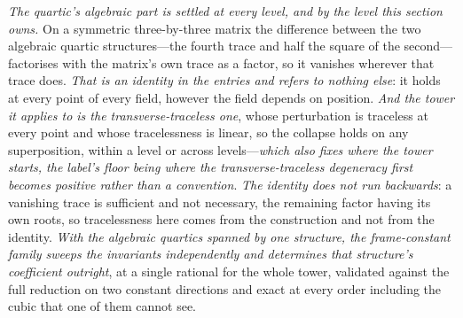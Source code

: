 \documentclass[11pt,a4paper]{article}
\theoremstyle{plain}
\theoremstyle{definition}
\theoremstyle{remark}
\begin{document}
\emph{The quartic's algebraic part is settled at every level, and by the level this section owns.} On a
symmetric three-by-three matrix the difference between the two algebraic quartic structures---the fourth
trace and half the square of the second---factorises with the matrix's own trace as a factor, so it vanishes
wherever that trace does. \emph{That is an identity in the entries and refers to nothing else}: it holds at
every point of every field, however the field depends on position. \emph{And the tower it applies to is the
transverse-traceless one}, whose perturbation is traceless at every point and whose tracelessness is linear,
so the collapse holds on any superposition, within a level or across levels---\emph{which also fixes where the
tower starts, the label's floor being where the transverse-traceless degeneracy first becomes positive rather
than a convention}. \emph{The identity does not run backwards}: a vanishing trace is sufficient and not
necessary, the remaining factor having its own roots, so tracelessness here comes from the construction and
not from the identity. \emph{With the algebraic quartics spanned by one structure, the frame-constant family
sweeps the invariants independently and determines that structure's coefficient outright}, at a single
rational for the whole tower, validated against the full reduction on two constant directions and exact at
every order including the cubic that one of them cannot see.
\end{document}

